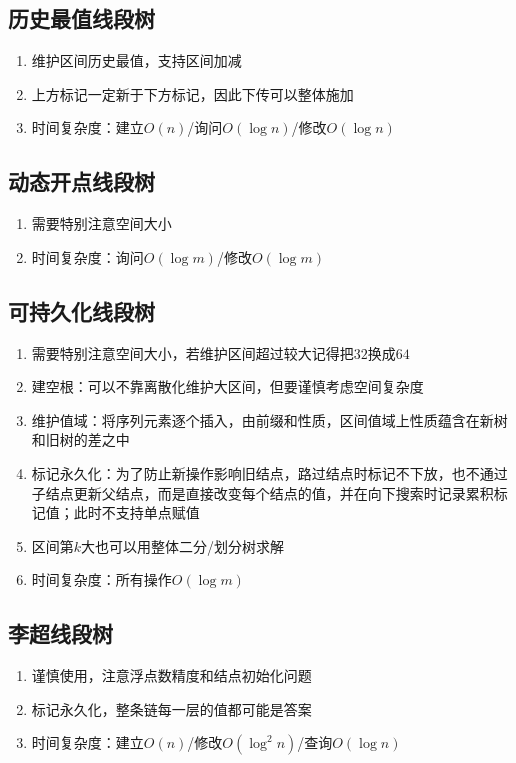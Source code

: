 \documentclass[twocolumn,a4,8pt]{article}  %
\begin{document}
		\subsection{历史最值线段树}
			\noindent\begin{enumerate}
			 	\item 维护区间历史最值，支持区间加减
			 	\item 上方标记一定新于下方标记，因此下传可以整体施加
				\item 时间复杂度：建立$O(n)$/询问$O(\log n)$/修改$O(\log n)$
			\end{enumerate}
	 	 	
	 	 	
	 	\subsection{动态开点线段树}
			\noindent\begin{enumerate}
				\item 需要特别注意空间大小
				\item 时间复杂度：询问$O(\log m)$/修改$O(\log m)$
			\end{enumerate}
	 	 	
	 	 	
		\subsection{可持久化线段树}
			\noindent\begin{enumerate}
				\item 需要特别注意空间大小，若维护区间超过较大记得把$32$换成$64$
				\item 建空根：可以不靠离散化维护大区间，但要谨慎考虑空间复杂度
				\item 维护值域：将序列元素逐个插入，由前缀和性质，区间值域上性质蕴含在新树和旧树的差之中
				\item 标记永久化：为了防止新操作影响旧结点，路过结点时标记不下放，也不通过子结点更新父结点，而是直接改变每个结点的值，并在向下搜索时记录累积标记值；此时不支持单点赋值
				\item 区间第$k$大也可以用整体二分/划分树求解
				\item 时间复杂度：所有操作$O(\log m)$
			
			\end{enumerate}
	 	 	
	 	 	
		\subsection{李超线段树}
			\noindent\begin{enumerate}
				\item 谨慎使用，注意浮点数精度和结点初始化问题
				\item 标记永久化，整条链每一层的值都可能是答案
				\item 时间复杂度：建立$O(n)$/修改$O(\log^2n)$/查询$O(\log n)$
			\end{enumerate}
			
	 	 	
\end{document}
